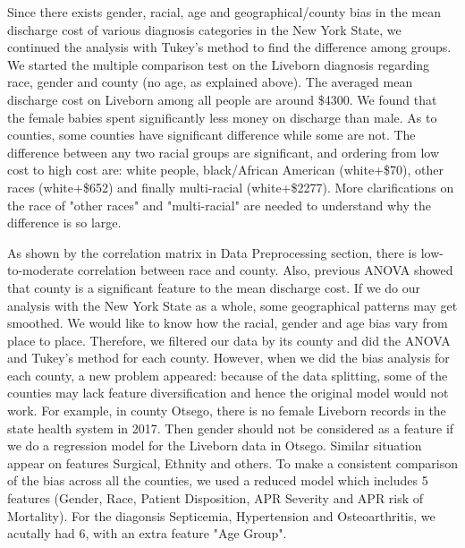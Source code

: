 \documentclass[10pt,twocolumn,letterpaper]{article}
\begin{document}
Since there exists gender, racial, age and geographical/county bias in the mean discharge cost of various diagnosis categories in the New York State, we continued the analysis with Tukey's method to find the difference among groups. We started the multiple comparison test on the Liveborn diagnosis regarding race, gender and county (no age, as explained above). The averaged mean discharge cost on Liveborn among all people are around \$4300. We found that the female babies spent significantly less money on discharge than male. As to counties, some counties have significant difference while some are not. The difference between any two racial groups are significant, and ordering from low cost to high cost are: white people, black/African American (white+\$70), other races  (white+\$652) and finally multi-racial  (white+\$2277). More clarifications on the race of "other races" and "multi-racial" are needed to understand why the difference is so large.

As shown by the correlation matrix in Data Preprocessing section, there is low-to-moderate correlation between race and county. Also, previous ANOVA showed that county is a significant feature to the mean discharge cost. If we do our analysis with the New York State as a whole, some geographical patterns may get smoothed. We would like to know how the racial, gender and age bias vary from place to place. Therefore, we filtered our data by its county and did the ANOVA and Tukey's method for each county. However, when we did the bias analysis for each county, a new problem appeared: because of the data splitting, some of the counties may lack feature diversification and hence the original model would not work. For example, in county Otsego, there is no female Liveborn records in the state health system in 2017. Then gender should not be considered as a feature if we do a regression model for the Liveborn data in Otsego. Similar situation appear on features Surgical, Ethnity and others. To make a consistent comparison of the bias across all the counties, we used a reduced model which includes 5 features (Gender, Race, Patient Disposition, APR Severity and APR risk of Mortality). For the diagonsis Septicemia, Hypertension and Osteoarthritis, we acutally had 6, with an extra feature "Age Group".
\end{document}
